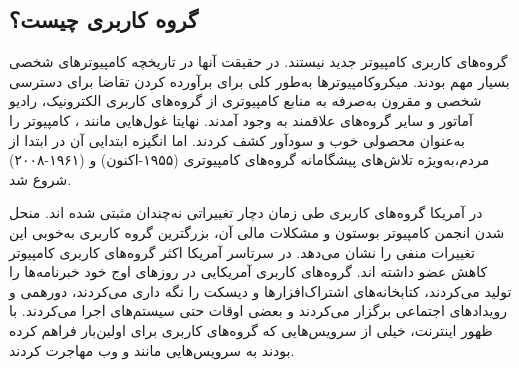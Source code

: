 \subsection{گروه کاربری چیست؟}

گروه‌های کاربری کامپیوتر جدید نیستند. در حقیقت آنها در تاریخچه کامپیوترهای شخصی
بسیار مهم بودند. میکروکامپیوتر‌ها به‌طور کلی برای برآورده کردن تقاضا برای دسترسی شخصی
و مقرون به‌صرفه به منابع کامپیوتری از گروه‌های کاربری الکترونیک، رادیو آماتور و سایر گروه‌های
علاقمند به وجود آمدند. نهایتا غول‌هایی مانند
،
کامپیوتر را به‌عنوان محصولی خوب و سودآور
کشف کردند. اما انگیزه ابتدایی آن در ابتدا از مردم،‌به‌ویژه تلاش‌های پیشگامانه
گروه‌های کامپیوتری  (۱۹۵۵-اکنون) و  (۱۹۶۱-۲۰۰۸) شروع شد.

در آمریکا گروه‌های کاربری طی زمان دچار تغییراتی نه‌چندان مثبتی شده اند.
منحل شدن انجمن کامپیوتر بوستون
و مشکلات مالی آن، بزرگترین گروه کاربری به‌خوبی این تغییرات منفی را نشان می‌دهد.
در سرتاسر آمریکا اکثر گروه‌های کاربری کامپیوتر کاهش عضو داشته اند.
گروه‌های کاربری آمریکایی در روزهای اوج خود خبرنامه‌ها را تولید می‌کردند،
کتابخانه‌های اشتراک‌افزارها و دیسکت را نگه داری می‌کردند،
دورهمی و رویدادهای اجتماعی برگزار می‌کردند و
بعضی اوقات حتی سیستم‌های
اجرا می‌کردند. با ظهور اینترنت، خیلی از سرویس‌هایی که گروه‌های کاربری
برای اولین‌بار فراهم کرده بودند به سرویس‌هایی مانند
و وب مهاجرت کردند.

